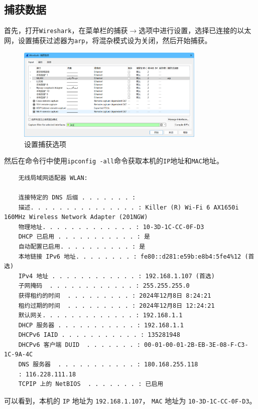 \documentclass{article}
\begin{document}
\subsection{捕获数据}

首先，打开\texttt{Wireshark}，在菜单栏的捕获\(\to \)选项中进行设置，选择已连接的以太网，设置捕获过滤器为\texttt{arp}，将混杂模式设为关闭，然后开始捕获。

\begin{figure}[H]
  \centering
  \includegraphics[width=0.8\textwidth]{img/1.png}
  \caption{设置捕获选项}
  \label{fig:1}
\end{figure}

然后在命令行中使用\texttt{ipconfig -all}命令获取本机的\texttt{IP}地址和\texttt{MAC}地址。

\begin{lstlisting}
	无线局域网适配器 WLAN:
	
	连接特定的 DNS 后缀 . . . . . . . :
	描述. . . . . . . . . . . . . . . : Killer (R) Wi-Fi 6 AX1650i 160MHz Wireless Network Adapter (201NGW)
	物理地址. . . . . . . . . . . . . : 10-3D-1C-CC-0F-D3
	DHCP 已启用 . . . . . . . . . . . : 是
	自动配置已启用. . . . . . . . . . : 是
	本地链接 IPv6 地址. . . . . . . . : fe80::d281:e59b:e8b4:5fe4%12 (首选)
	IPv4 地址 . . . . . . . . . . . . : 192.168.1.107 (首选)
	子网掩码  . . . . . . . . . . . . : 255.255.255.0
	获得租约的时间  . . . . . . . . . : 2024年12月8日 8:24:21
	租约过期的时间  . . . . . . . . . : 2024年12月8日 12:24:21
	默认网关. . . . . . . . . . . . . : 192.168.1.1
	DHCP 服务器 . . . . . . . . . . . : 192.168.1.1
	DHCPv6 IAID . . . . . . . . . . . : 135281948
	DHCPv6 客户端 DUID  . . . . . . . : 00-01-00-01-2B-EB-3E-08-F-C3-1C-9A-4C
	DNS 服务器  . . . . . . . . . . . : 180.168.255.118
	: 116.228.111.18
	TCPIP 上的 NetBIOS  . . . . . . . : 已启用
\end{lstlisting}

可以看到，本机的 \texttt{IP} 地址为 \texttt{192.168.1.107}， \texttt{MAC} 地址为 \texttt{10-3D-1C-CC-0F-D3}。
\end{document}
